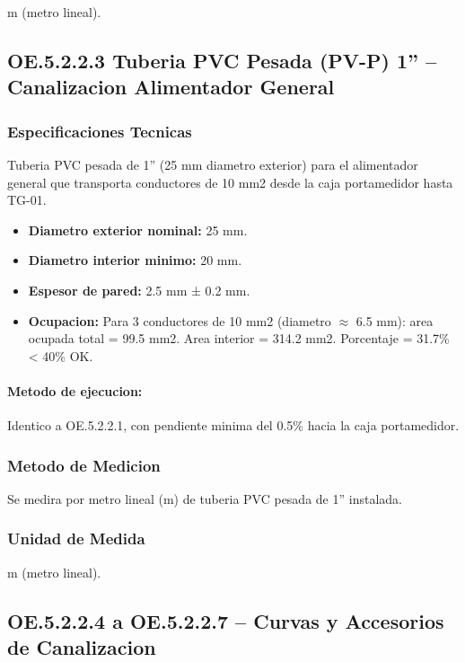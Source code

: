 m (metro lineal).

\subsection{OE.5.2.2.3 Tuberia PVC Pesada (PV-P) 1'' -- Canalizacion Alimentador General}

\subsubsection{Especificaciones Tecnicas}

Tuberia PVC pesada de 1'' (25 mm diametro exterior) para el alimentador general que transporta conductores de 10 mm2 desde la caja portamedidor hasta TG-01.

\begin{itemize}[nosep]
  \item \textbf{Diametro exterior nominal:} 25 mm.
  \item \textbf{Diametro interior minimo:} 20 mm.
  \item \textbf{Espesor de pared:} 2.5 mm ± 0.2 mm.
  \item \textbf{Ocupacion:} Para 3 conductores de 10 mm2 (diametro $\approx$ 6.5 mm): area ocupada total = 99.5 mm2. Area interior = 314.2 mm2. Porcentaje = 31.7\% < 40\% OK.
\end{itemize}

\paragraph{Metodo de ejecucion:} Identico a OE.5.2.2.1, con pendiente minima del 0.5\% hacia la caja portamedidor.

\subsubsection{Metodo de Medicion}

Se medira por metro lineal (m) de tuberia PVC pesada de 1'' instalada.

\subsubsection{Unidad de Medida}

m (metro lineal).

\subsection{OE.5.2.2.4 a OE.5.2.2.7 -- Curvas y Accesorios de Canalizacion}

